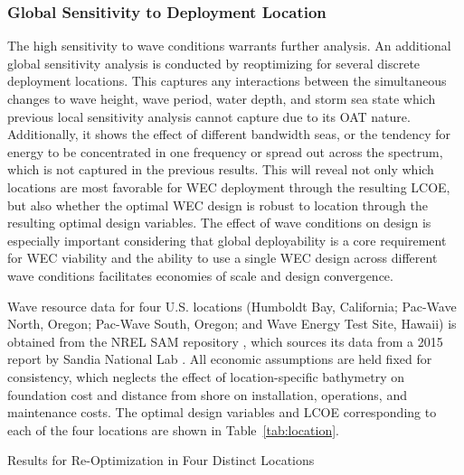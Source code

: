 
\subsubsection{Global Sensitivity to Deployment Location}
The high sensitivity to wave conditions warrants further analysis.
An additional global sensitivity analysis is conducted by reoptimizing for several discrete deployment locations.
This captures any interactions between the simultaneous changes to wave height, wave period, water depth, and storm sea state which previous local sensitivity analysis cannot capture due to its OAT nature.
Additionally, it shows the effect of different bandwidth seas, or the tendency for energy to be concentrated in one frequency or spread out across the spectrum, which is not captured in the previous results.
This will reveal not only which locations are most favorable for WEC deployment through the resulting LCOE, but also whether the optimal WEC design is robust to location through the resulting optimal design variables.
The effect of wave conditions on design is especially important considering that global deployability is a core requirement for WEC viability \cite{bull_systems_2017} and the ability to use a single WEC design across different wave conditions facilitates economies of scale and design convergence.

Wave resource data for four U.S. locations (Humboldt Bay, California; Pac-Wave North, Oregon; Pac-Wave South, Oregon; and Wave Energy Test Site, Hawaii) is obtained from the NREL SAM repository \cite{janzou_sam_2022}, which sources its data from a 2015 report by Sandia National Lab \cite{dallman_characterization_2015}.
All economic assumptions are held fixed for consistency, which neglects the effect of location-specific bathymetry on foundation cost and distance from shore on installation, operations, and maintenance costs.
The optimal design variables and LCOE corresponding to each of the four locations are shown in Table~\ref{tab:location}.

\begin{table}\label{tab:location}\setlength\arraycolsep{1pt}

\caption{Results for Re-Optimization in Four Distinct Locations}
\end{table}

